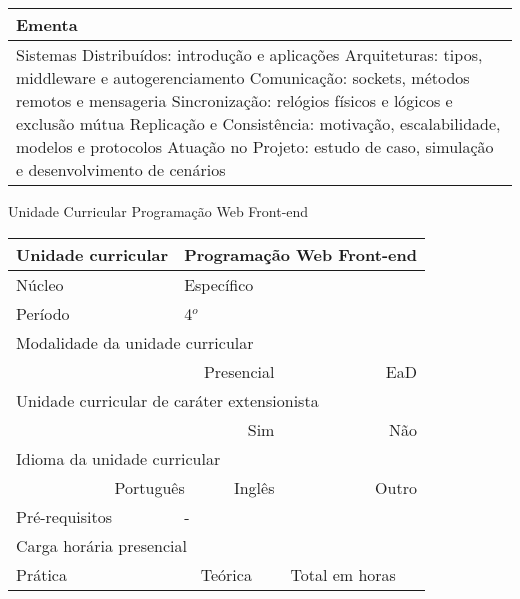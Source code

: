 \begin{quadro}[ht!]
\begin{tabular}{|p{3cm} p{2cm} p{3cm} p{2cm} p{3cm} p{2cm}|}
\multicolumn{6}{|p{15cm}|}{\cellcolor{blue1} Ementa} \\\hline
\hline\multicolumn{6}{|p{15cm}|}{\scriptsize Sistemas Distribuídos: introdução e aplicações Arquiteturas: tipos, middleware e autogerenciamento Comunicação: sockets, métodos remotos e mensageria Sincronização: relógios físicos e lógicos e exclusão mútua Replicação e Consistência: motivação, escalabilidade, modelos e protocolos Atuação no Projeto: estudo de caso, simulação e desenvolvimento de cenários}\\\hline
\hline
	\end{tabular}
\end{quadro}
\begin{quadro}[ht!]
  \centering\scriptsize
\caption{Unidade Curricular Programação Web Front-end}
\label{ unit_20 }
\begin{tabular}{|p{3cm} p{2cm} p{3cm} p{2cm} p{3cm} p{2cm}|}\hline
\multicolumn{1}{|p{3cm}|}{\cellcolor{blue1} Unidade curricular} & \multicolumn{5}{p{9cm}|}{ Programação Web Front-end }\\\hline
\multicolumn{1}{|p{3cm}|}{\cellcolor{blue1} Núcleo} & \multicolumn{5}{p{11.5cm}|}{ Específico }\\\hline
\multicolumn{1}{|p{3cm}|}{\cellcolor{blue1} Período} & \multicolumn{5}{p{9cm}|}{ 4$^o$ }\\\hline
\multicolumn{6}{|p{15cm}|}{\cellcolor{blue1} Modalidade da unidade curricular} \\\hline
\multicolumn{2}{|r}{		} &  \multicolumn{2}{r}{Presencial \XBox } & \multicolumn{2}{r|}{EaD \Square	} \\\hline
\multicolumn{6}{|p{15cm}|}{\cellcolor{blue1} Unidade curricular de caráter extensionista} \\\hline
\multicolumn{4}{|r}{			Sim \Square	} & \multicolumn{2}{r|}{	Não \XBox	}\\\hline
\multicolumn{6}{|p{15cm}|}{\cellcolor{blue1} Idioma da unidade curricular} \\ \hline
\multicolumn{2}{|r}{	Português \XBox	} &  \multicolumn{2}{r}{	Inglês \Square	} & \multicolumn{2}{r|}{	Outro \Square	} \\ \hline
\multicolumn{1}{|p{3cm}|}{\cellcolor{blue1} Pré-requisitos} & \multicolumn{5}{p{9cm}|}{ - }\\ \hline
\multicolumn{6}{|p{15cm}|}{\cellcolor{blue1} Carga horária presencial} \\ \hline
\multicolumn{1}{|p{3cm}|}{\raggedleft Prática} & \multicolumn{1}{p{1cm}|}{\centering	30	} &  \multicolumn{1}{p{3cm}|}{\raggedleft Teórica}  & \multicolumn{1}{p{1cm}|}{\centering 	30 } & \multicolumn{1}{p{3cm}|}{\raggedleft Total em horas} & \multicolumn{1}{p{1cm}|}{\raggedleft	60	} \\ \hline

\end{tabular}
\end{quadro}

